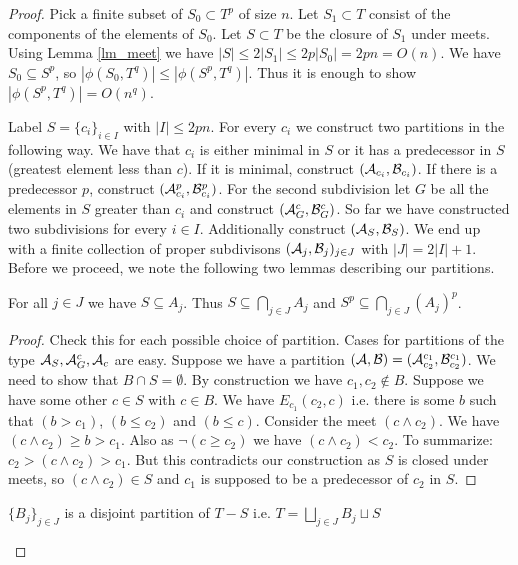 \begin{proof}
  Pick a finite subset of $S_0 \subset T^p$ of size $n$. Let $S_1 \subset T$ consist of the components of the elements of $S_0$. Let $S \subset T$ be the closure of $S_1$ under meets. Using Lemma \ref{lm_meet} we have $|S| \leq 2|S_1| \leq 2p|S_0| = 2pn = O(n)$. We have $S_0 \subseteq S^p$, so $|\phi(S_0, T^q)| \leq |\phi(S^p, T^q)|$. Thus it is enough to show $|\phi(S^p, T^q)| = O(n^q)$.
  
  Label $S = \{c_i\}_{i \in I}$ with $|I| \leq 2pn$. For every $c_i$ we construct two partitions in the following way. We have that $c_i$ is either minimal in $S$ or it has a predecessor in $S$ (greatest element less than $c$). If it is minimal, construct $(\mathcal A_{c_i}, \mathcal B_{c_i})$. If there is a predecessor $p$, construct $(\mathcal A^p_{c_i}, \mathcal B^p_{c_i})$. For the second subdivision let $G$ be all the elements in $S$ greater than $c_i$ and construct $(\mathcal A^c_G, \mathcal B^c_G)$. So far we have constructed two subdivisions for every $i \in I$. Additionally construct $(\mathcal A_S, \mathcal B_S)$. We end up with a finite collection of proper subdivisons $(\mathcal A_j, \mathcal B_j)_{j \in J}$ with $|J| = 2|I| + 1$. Before we proceed, we note the following two lemmas describing our partitions.
  
  \begin{Lemma}
    For all $j \in J$ we have $S \subseteq A_j$. Thus $S \subseteq \bigcap_{j \in J} A_j$ and $S^p \subseteq \bigcap_{j \in J} (A_j)^p$. 
  \end{Lemma}
  
  \begin{proof}
    Check this for each possible choice of partition. Cases for partitions of the type $\mathcal A_S, \mathcal A^c_G, \mathcal A_c$ are easy. Suppose we have a partition $(\mathcal A, \mathcal B) = (\mathcal A^{c_1}_{c_2}, \mathcal B^{c_1}_{c_2})$. We need to show that $B \cap S = \emptyset$. By construction we have $c_1, c_2 \notin B$. Suppose we have some other $c \in S$ with $c \in B$. We have $E_{c_1}(c_2, c)$ i.e. there is some $b$ such that $(b > c_1)$, $(b \leq c_2)$ and $(b \leq c)$. Consider the meet $(c \wedge c_2)$. We have $(c \wedge c_2) \geq b > c_1$. Also as $\neg (c \geq c_2)$ we have $(c \wedge c_2) < c_2$. To summarize: $c_2 > (c \wedge c_2) > c_1$. But this contradicts our construction as $S$ is closed under meets, so $(c \wedge c_2) \in S$ and $c_1$ is supposed to be a predecessor of $c_2$ in $S$.
  \end{proof}
  
  \begin{Lemma}
    $\{B_j\}_{j \in J}$ is a disjoint partition of $T - S$ i.e. $T = \bigsqcup_{j \in J} B_j \sqcup S$
  \end{Lemma}
  

\end{proof}
